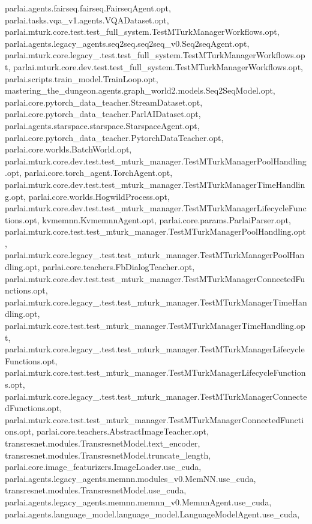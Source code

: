 parlai.\+agents.\+fairseq.\+fairseq.\+Fairseq\+Agent.\+opt, parlai.\+tasks.\+vqa\+\_\+v1.\+agents.\+V\+Q\+A\+Dataset.\+opt, parlai.\+mturk.\+core.\+test.\+test\+\_\+full\+\_\+system.\+Test\+M\+Turk\+Manager\+Workflows.\+opt, parlai.\+agents.\+legacy\+\_\+agents.\+seq2seq.\+seq2seq\+\_\+v0.\+Seq2seq\+Agent.\+opt, parlai.\+mturk.\+core.\+legacy\+\_.\+test.\+test\+\_\+full\+\_\+system.\+Test\+M\+Turk\+Manager\+Workflows.\+opt, parlai.\+mturk.\+core.\+dev.\+test.\+test\+\_\+full\+\_\+system.\+Test\+M\+Turk\+Manager\+Workflows.\+opt, parlai.\+scripts.\+train\+\_\+model.\+Train\+Loop.\+opt, mastering\+\_\+the\+\_\+dungeon.\+agents.\+graph\+\_\+world2.\+models.\+Seq2\+Seq\+Model.\+opt, parlai.\+core.\+pytorch\+\_\+data\+\_\+teacher.\+Stream\+Dataset.\+opt, parlai.\+core.\+pytorch\+\_\+data\+\_\+teacher.\+Parl\+A\+I\+Dataset.\+opt, parlai.\+agents.\+starspace.\+starspace.\+Starspace\+Agent.\+opt, parlai.\+core.\+pytorch\+\_\+data\+\_\+teacher.\+Pytorch\+Data\+Teacher.\+opt, parlai.\+core.\+worlds.\+Batch\+World.\+opt, parlai.\+mturk.\+core.\+dev.\+test.\+test\+\_\+mturk\+\_\+manager.\+Test\+M\+Turk\+Manager\+Pool\+Handling.\+opt, parlai.\+core.\+torch\+\_\+agent.\+Torch\+Agent.\+opt, parlai.\+mturk.\+core.\+dev.\+test.\+test\+\_\+mturk\+\_\+manager.\+Test\+M\+Turk\+Manager\+Time\+Handling.\+opt, parlai.\+core.\+worlds.\+Hogwild\+Process.\+opt, parlai.\+mturk.\+core.\+dev.\+test.\+test\+\_\+mturk\+\_\+manager.\+Test\+M\+Turk\+Manager\+Lifecycle\+Functions.\+opt, kvmemnn.\+Kvmemnn\+Agent.\+opt, parlai.\+core.\+params.\+Parlai\+Parser.\+opt, parlai.\+mturk.\+core.\+test.\+test\+\_\+mturk\+\_\+manager.\+Test\+M\+Turk\+Manager\+Pool\+Handling.\+opt, parlai.\+mturk.\+core.\+legacy\+\_.\+test.\+test\+\_\+mturk\+\_\+manager.\+Test\+M\+Turk\+Manager\+Pool\+Handling.\+opt, parlai.\+core.\+teachers.\+Fb\+Dialog\+Teacher.\+opt, parlai.\+mturk.\+core.\+dev.\+test.\+test\+\_\+mturk\+\_\+manager.\+Test\+M\+Turk\+Manager\+Connected\+Functions.\+opt, parlai.\+mturk.\+core.\+legacy\+\_.\+test.\+test\+\_\+mturk\+\_\+manager.\+Test\+M\+Turk\+Manager\+Time\+Handling.\+opt, parlai.\+mturk.\+core.\+test.\+test\+\_\+mturk\+\_\+manager.\+Test\+M\+Turk\+Manager\+Time\+Handling.\+opt, parlai.\+mturk.\+core.\+legacy\+\_.\+test.\+test\+\_\+mturk\+\_\+manager.\+Test\+M\+Turk\+Manager\+Lifecycle\+Functions.\+opt, parlai.\+mturk.\+core.\+test.\+test\+\_\+mturk\+\_\+manager.\+Test\+M\+Turk\+Manager\+Lifecycle\+Functions.\+opt, parlai.\+mturk.\+core.\+legacy\+\_.\+test.\+test\+\_\+mturk\+\_\+manager.\+Test\+M\+Turk\+Manager\+Connected\+Functions.\+opt, parlai.\+mturk.\+core.\+test.\+test\+\_\+mturk\+\_\+manager.\+Test\+M\+Turk\+Manager\+Connected\+Functions.\+opt, parlai.\+core.\+teachers.\+Abstract\+Image\+Teacher.\+opt, transresnet.\+modules.\+Transresnet\+Model.\+text\+\_\+encoder, transresnet.\+modules.\+Transresnet\+Model.\+truncate\+\_\+length, parlai.\+core.\+image\+\_\+featurizers.\+Image\+Loader.\+use\+\_\+cuda, parlai.\+agents.\+legacy\+\_\+agents.\+memnn.\+modules\+\_\+v0.\+Mem\+N\+N.\+use\+\_\+cuda, transresnet.\+modules.\+Transresnet\+Model.\+use\+\_\+cuda, parlai.\+agents.\+legacy\+\_\+agents.\+memnn.\+memnn\+\_\+v0.\+Memnn\+Agent.\+use\+\_\+cuda, parlai.\+agents.\+language\+\_\+model.\+language\+\_\+model.\+Language\+Model\+Agent.\+use\+\_\+cuda, 